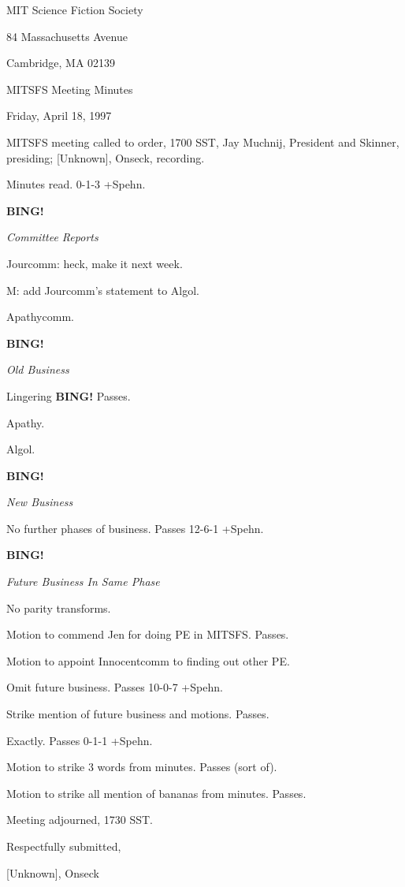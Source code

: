 \documentclass[12pt]{article}
\newcommand{\bing}{{\bf BING!} }
\newcommand{\goto}[1]{\bing \vskip 12pt \centerline{{\em{#1}}}}
\begin{document}
\begin{center}

MIT Science Fiction Society 

84 Massachusetts Avenue

Cambridge, MA 02139

\vspace{12pt}

MITSFS Meeting Minutes 

Friday, April 18, 1997

\end{center}
 
\vspace{18pt}

\setlength{\parskip}{6pt}

\noindent
MITSFS meeting called to order, 1700 SST,
Jay Muchnij, President and Skinner, presiding; [Unknown], Onseck, recording.

Minutes read. 0-1-3 +Spehn.

\goto{Committee Reports}

Jourcomm: heck, make it next week.

M: add Jourcomm's statement to Algol.

Apathycomm.

\goto{Old Business}

Lingering \bing Passes.

Apathy.

Algol.

\goto{New Business}

No further phases of business. Passes 12-6-1 +Spehn.

\goto{Future Business In Same Phase}

No parity transforms.

Motion to commend Jen for doing PE in MITSFS. Passes.

Motion to appoint Innocentcomm to finding out other PE.

Omit future business. Passes 10-0-7 +Spehn.

Strike mention of future business and motions. Passes.

Exactly. Passes 0-1-1 +Spehn.

Motion to strike 3 words from minutes. Passes (sort of).

Motion to strike all mention of bananas from minutes. Passes.

\vspace{12pt}

\noindent
Meeting adjourned, 1730 SST.

\vspace{18pt}

\centerline{Respectfully submitted,}
\centerline{[Unknown], Onseck}
\end{document}
